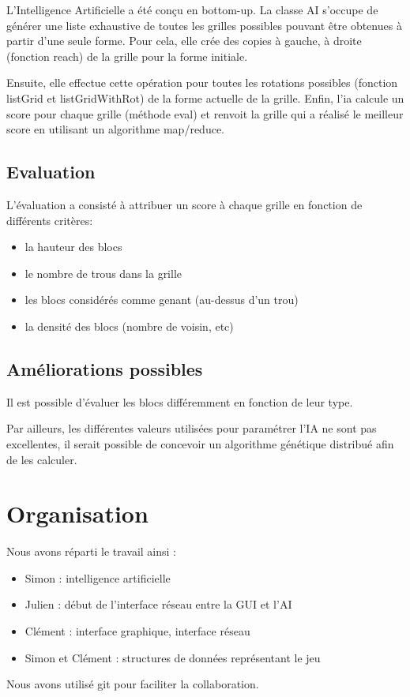 \documentclass[11pt]{article}
\begin{document}
L'Intelligence Artificielle a été conçu en bottom-up.  La classe AI
s'occupe de générer une liste exhaustive de toutes les grilles
possibles pouvant être obtenues à partir d'une seule forme.  Pour
cela, elle crée des copies à gauche, à droite (fonction reach) de la
grille pour la forme initiale.

Ensuite, elle effectue cette opération pour toutes les rotations
possibles (fonction listGrid et listGridWithRot) de la forme actuelle
de la grille.  Enfin, l'ia calcule un score pour chaque grille
(méthode eval) et renvoit la grille qui a réalisé le meilleur score en
utilisant un algorithme map/reduce.

\subsection{Evaluation}

L'évaluation a consisté à attribuer un score à chaque grille en fonction
de différents critères:

\begin{itemize}
 \item la hauteur des blocs 
 \item le nombre de trous dans la grille
 \item les blocs considérés comme genant (au-dessus d'un trou)
 \item la densité des blocs (nombre de voisin, etc)
\end{itemize}

\subsection{Améliorations possibles}

Il est possible d'évaluer les blocs différemment en fonction de leur
type.

Par ailleurs, les différentes valeurs utilisées pour paramétrer l'IA
ne sont pas excellentes, il serait possible de concevoir un algorithme
génétique distribué afin de les calculer.

\section{Organisation}
\label{sec-5}

Nous avons réparti le travail ainsi :

\begin{itemize}
  \item Simon : intelligence artificielle
  \item Julien : début de l'interface réseau entre la GUI et l'AI
  \item Clément : interface graphique, interface réseau 
  \item Simon et Clément : structures de données représentant le jeu

\end{itemize}

Nous avons utilisé git pour faciliter la collaboration.

\end{document}
